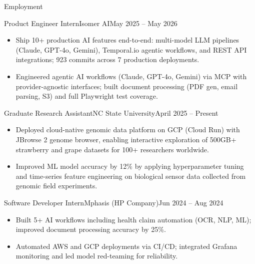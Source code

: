\documentclass[]{mcdowellcv}
\begin{document}
\makeheader

\begin{cvsection}{Employment}
  \begin{cvsubsection}{Product Engineer Intern}{Isomer AI}{May 2025 -- May 2026}
    \begin{itemize}
      \item Ship 10+ production AI features end-to-end: multi-model LLM pipelines (Claude, GPT-4o, Gemini), Temporal.io agentic workflows, and REST API integrations; 923 commits across 7 production deployments.
      \item Engineered agentic AI workflows (Claude, GPT-4o, Gemini) via MCP with provider-agnostic interfaces; built document processing (PDF gen, email parsing, S3) and full Playwright test coverage.
    \end{itemize}
    \vspace{-1.5pt}
  \end{cvsubsection}

  \begin{cvsubsection}{Graduate Research Assistant}{NC State University}{April 2025 -- Present}
    \begin{itemize}
      \item Deployed cloud-native genomic data platform on GCP (Cloud Run) with JBrowse 2 genome browser, enabling interactive exploration of 500GB+ strawberry and grape datasets for 100+ researchers worldwide.
      \item Improved ML model accuracy by 12\% by applying hyperparameter tuning and time-series feature engineering on biological sensor data collected from genomic field experiments.
    \end{itemize}
    \vspace{-1.5pt}
  \end{cvsubsection}

  \begin{cvsubsection}{Software Developer Intern}{Mphasis (HP Company)}{Jun 2024 -- Aug 2024}
    \begin{itemize}
      \item Built 5+ AI workflows including health claim automation (OCR, NLP, ML); improved document processing accuracy by 25\%.
      \item Automated AWS and GCP deployments via CI/CD; integrated Grafana monitoring and led model red-teaming for reliability.
    \end{itemize}
    \vspace{-1.5pt}
  \end{cvsubsection}


\end{cvsection}
\end{document}
